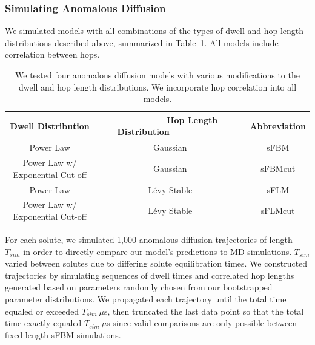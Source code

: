 \documentclass[journal=jctcce,manuscript=article]{achemso}
\begin{document}
  \subsubsection*{Simulating Anomalous Diffusion}

  We simulated models with all combinations of the types of dwell and hop length
  distributions described above, summarized in Table~\ref{table:anomalous_models}.
  All models include correlation between hops.

  \begin{table}[!htb]
	  \centering
	  \begin{tabular}{ccc}
            \hline
	  \hline
	  Dwell Distribution                & ~~~~~~~~~Hop Length Distribution~~~~~~~~~~~ & Abbreviation \\
	  \hline
      Power Law                         & Gaussian                & sFBM         \\
      Power Law w/ Exponential Cut-off  & Gaussian                & sFBMcut      \\
      Power Law                         & L\'evy Stable           & sFLM         \\
      Power Law w/ Exponential Cut-off  & L\'evy Stable           & sFLMcut      \\
	  \hline
          \hline
	  \end{tabular}
	  \caption{We tested four anomalous diffusion models with various modifications 
	  to the dwell and hop length distributions. We incorporate hop correlation 
	  into all models.}\label{table:anomalous_models}
          
 \end{table}

  For each solute, we simulated 1,000 anomalous diffusion trajectories of
  length $T_{sim}$ in order to directly compare our model's predictions to MD
  simulations. $T_{sim}$ varied between solutes due to differing solute
  equilibration times. We constructed trajectories by simulating sequences of
  dwell times and correlated hop lengths generated based on parameters randomly
  chosen from our bootstrapped parameter distributions. We propagated each
  trajectory until the total time equaled or exceeded $T_{sim}~ \mu$s, then
  truncated the last data point so that the total time exactly equaled
  $T_{sim}~ \mu$s since valid comparisons are only possible between fixed
  length sFBM simulations. 
  
\end{document}
